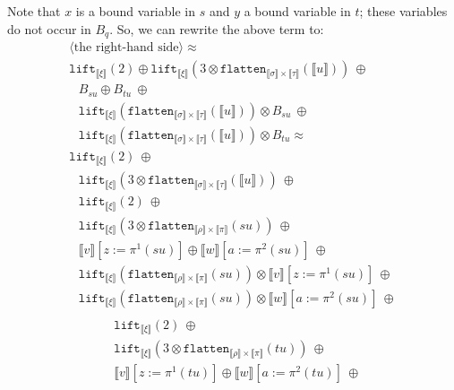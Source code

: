 \documentclass[a4paper,UKenglish,cleveref,autoref,numberwithinsect]{lipics-v2019}
\theoremstyle{definition}
\newcommand{\flatten}{\mathtt{flatten}}
\newcommand{\lift}{\mathtt{lift}}
\newcommand{\typeinterpret}[1]{\llbracket #1 \rrbracket}
\newcommand{\interpret}[1]{\llbracket #1 \rrbracket}
\begin{document}
\begin{itemize}
\[  \]
  Note that $x$ is a bound variable in $s$ and $y$ a bound variable
  in $t$; these variables do not occur in $B_q$.  So, we can rewrite
  the above term to:
  \[
  \begin{array}{l}
  \langle\text{the right-hand side}\rangle \approx \\
  \lift_{\typeinterpret{\xi}}(2) \oplus
    \lift_{\typeinterpret{\xi}}(3 \otimes \flatten_{\typeinterpret{
    \sigma} \times \typeinterpret{\tau}}(\interpret{u}))\ \oplus \\
  \phantom{A}
  B_{su} \oplus
  B_{tu}\ \oplus \\
  \phantom{A}
  \lift_{\typeinterpret{\xi}}(\flatten_{\typeinterpret{\sigma}
    \times \typeinterpret{\tau}}(\interpret{u})) \otimes
    B_{su}\ \oplus \\
  \phantom{A}
    \lift_{\typeinterpret{\xi}}(\flatten_{\typeinterpret{\sigma}
    \times \typeinterpret{\tau}}(\interpret{u})) \otimes
    B_{tu} \approx \\
  \lift_{\typeinterpret{\xi}}(2)\ \oplus \\
  \phantom{A}
    \lift_{\typeinterpret{\xi}}(3 \otimes \flatten_{\typeinterpret{
    \sigma} \times \typeinterpret{\tau}}(\interpret{u}))\ \oplus \\
  \phantom{A}
    \lift_{\typeinterpret{\xi}}(2)\ \oplus \\
  \phantom{A}
    \lift_{\typeinterpret{\xi}}(3 \otimes \flatten_{
    \typeinterpret{\rho} \times \typeinterpret{\pi}}(su))\ \oplus \\
  \phantom{A}
    \interpret{v}[z:=\pi^1(su)] \oplus
    \interpret{w}[a:=\pi^2(su)]\ \oplus \\
  \phantom{A}
    \lift_{\typeinterpret{\xi}}(\flatten_{\typeinterpret{\rho} \times
    \typeinterpret{\pi}}(su)) \otimes \interpret{v}[z:=\pi^1(su)]\
    \oplus \\
  \phantom{A}
    \lift_{\typeinterpret{\xi}}(\flatten_{\typeinterpret{\rho}
    \times \typeinterpret{\pi}}(su)) \otimes \interpret{w}[a:=\pi^2(su)]
    \ \oplus \\
  \end{array}
  \]
  \[
  \begin{array}{l}
  \phantom{A}
    \lift_{\typeinterpret{\xi}}(2)\ \oplus \\
  \phantom{A}
    \lift_{\typeinterpret{\xi}}(3 \otimes \flatten_{
    \typeinterpret{\rho} \times \typeinterpret{\pi}}(tu))\ \oplus \\
  \phantom{A}
    \interpret{v}[z:=\pi^1(tu)] \oplus
    \interpret{w}[a:=\pi^2(tu)]\ \oplus \\

\end{array}\]
\end{itemize}
\end{document}
